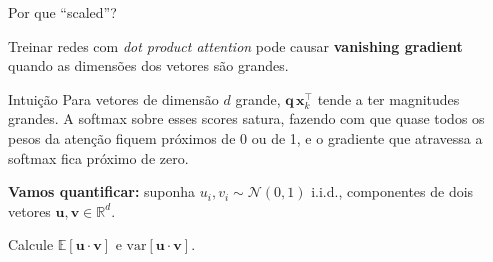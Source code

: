 \documentclass[aspectratio=169,xcolor=dvipsnames]{beamer}
\begin{document}
\begin{frame}{Por que ``scaled''?}

Treinar redes com \textit{dot product attention} pode causar \textbf{vanishing gradient} quando as dimensões dos vetores são grandes.

\vspace{6pt}

\begin{block}{Intuição}
Para vetores de dimensão $d$ grande, $\mathbf{q}\,\mathbf{x}_k^{\top}$ tende a ter magnitudes grandes. A softmax sobre esses scores satura, fazendo com que quase todos os pesos da atenção fiquem próximos de 0 ou de 1, e o gradiente que atravessa a softmax fica próximo de zero.
\end{block}

\vspace{6pt}

\textbf{Vamos quantificar:} suponha $u_i, v_i \sim \mathcal{N}(0, 1)$ i.i.d., componentes de dois vetores $\mathbf{u}, \mathbf{v} \in \mathbb{R}^d$.

\vspace{4pt}
Calcule $\mathbb{E}[\mathbf{u} \cdot \mathbf{v}]$ e $\mathrm{var}[\mathbf{u} \cdot \mathbf{v}]$.

\end{frame}

\end{document}
